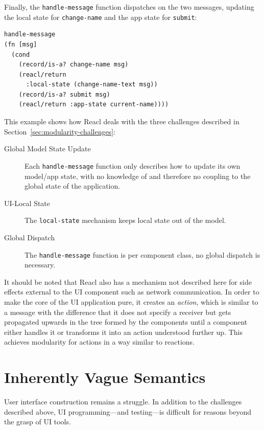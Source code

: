 \documentclass[sigplan,review,screen]{acmart}
\begin{document}
Finally, the \texttt{handle-message} function dispatches on the two
messages, updating the local state for \texttt{change-name} and the
app state for \texttt{submit}:
%
\begin{verbatim}
handle-message
(fn [msg]
  (cond
    (record/is-a? change-name msg)
    (reacl/return
      :local-state (change-name-text msg))
    (record/is-a? submit msg)
    (reacl/return :app-state current-name))))
\end{verbatim}
%
This example shows how Reacl deals with the three challenges described
in Section~\ref{sec:modularity-challenges}:
%
\begin{description}
\item[Global Model State Update] Each \texttt{handle-message} function
  only describes how to update its own model/app state, with no
  knowledge of and therefore no coupling to the global state of the
  application.
\item[UI-Local State] The \texttt{local-state} mechanism keeps local
  state out of the model.
\item[Global Dispatch] The \texttt{handle-message} function is per
  component class, no global dispatch is necessary.
\end{description}
%
It should be noted that Reacl also has a mechanism not described here
for side effects external to the UI component 
such as network
communication.  In order to make the core of the UI application pure,
it creates an \textit{action}, which is similar to a message with the
difference that it does not specify a receiver but gets propagated
upwards in the tree formed by the components until a component either
handles it or transforms it into an action understood further up.
This achieves modularity for actions in a way similar to reactions.

\section{Inherently Vague Semantics}
\label{sec:vague-semantics}

User interface construction remains a struggle. In addition to
the challenges described above, UI programming---and testing---is
difficult for reasons beyond the grasp of UI
tools.
\end{document}
